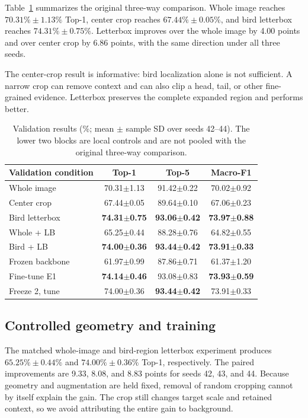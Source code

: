 \documentclass[10pt,twocolumn,letterpaper]{article}
\begin{document}
Table~\ref{tab:main-validation} summarizes the original three-way comparison.
Whole image reaches $70.31\%\pm1.13\%$ Top-1, center crop reaches
$67.44\%\pm0.05\%$, and bird letterbox reaches
$74.31\%\pm0.75\%$. Letterbox improves over the whole image by 4.00 points and
over center crop by 6.86 points, with the same direction under all three
seeds.

The center-crop result is informative: bird localization alone is not
sufficient. A narrow crop can remove context and can also clip a head, tail,
or other fine-grained evidence. Letterbox preserves the complete expanded
region and performs better.

\begin{table}[t]
\centering
\footnotesize
\setlength{\tabcolsep}{2pt}
\begin{tabular}{lccc}
\toprule
Validation condition & Top-1 & Top-5 & Macro-F1 \\
\midrule
Whole image & 70.31$\pm$1.13 & 91.42$\pm$0.22 & 70.02$\pm$0.92 \\
Center crop & 67.44$\pm$0.05 & 89.64$\pm$0.10 & 67.06$\pm$0.23 \\
Bird letterbox & \textbf{74.31$\pm$0.75} & \textbf{93.06$\pm$0.42} & \textbf{73.97$\pm$0.88} \\
\midrule
Whole + LB & 65.25$\pm$0.44 & 88.28$\pm$0.76 & 64.82$\pm$0.55 \\
Bird + LB & \textbf{74.00$\pm$0.36} & \textbf{93.44$\pm$0.42} & \textbf{73.91$\pm$0.33} \\
\midrule
Frozen backbone & 61.97$\pm$0.99 & 87.86$\pm$0.71 & 61.37$\pm$1.20 \\
Fine-tune E1 & \textbf{74.14$\pm$0.46} & 93.08$\pm$0.83 & \textbf{73.93$\pm$0.59} \\
Freeze 2, tune & 74.00$\pm$0.36 & \textbf{93.44$\pm$0.42} & 73.91$\pm$0.33 \\
\bottomrule
\end{tabular}
\caption{Validation results (\%; mean $\pm$ sample SD over seeds 42--44).
The lower two blocks are local controls and are not pooled with the original
three-way comparison.}
\label{tab:main-validation}
\end{table}

\subsection{Controlled geometry and training}

The matched whole-image and bird-region letterbox experiment produces
$65.25\%\pm0.44\%$ and $74.00\%\pm0.36\%$ Top-1, respectively. The paired
improvements are 9.33, 8.08, and 8.83 points for seeds 42, 43, and 44.
Because geometry and augmentation are held fixed, removal of random cropping
cannot by itself explain the gain. The crop still changes target scale and
retained context, so we avoid attributing the entire gain to background.
\end{document}
